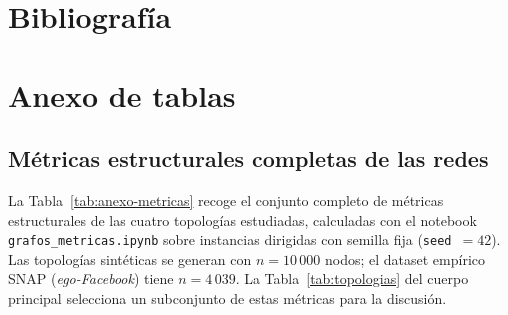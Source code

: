 \documentclass[12pt]{extarticle}
\numberwithin{equation}{section}
\begin{document}
\newpage

\section{Bibliograf\'ia} \label{sec:bibliography}

\printbibliography[heading=none]
\newpage

\appendix
\section*{Anexo de tablas}

\subsection*{Métricas estructurales completas de las redes}
\label{anexo:metricas-redes}

La Tabla~\ref{tab:anexo-metricas} recoge el conjunto completo de métricas estructurales de las cuatro topologías estudiadas, calculadas con el notebook \texttt{grafos\_metricas.ipynb} sobre instancias dirigidas con semilla fija (\texttt{seed}~$=42$). Las topologías sintéticas se generan con $n = 10\,000$ nodos; el dataset empírico SNAP (\emph{ego-Facebook}) tiene $n = 4\,039$. La Tabla~\ref{tab:topologias} del cuerpo principal selecciona un subconjunto de estas métricas para la discusión.
\end{document}
